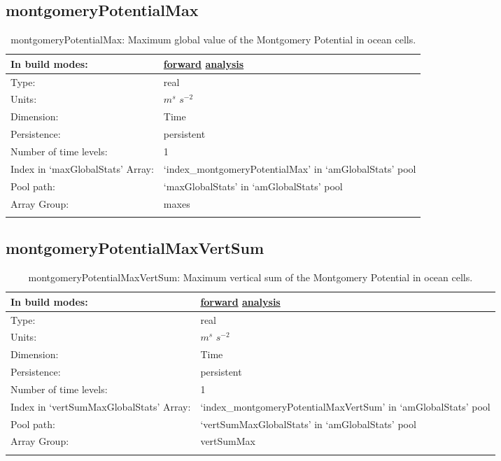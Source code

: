 \subsection[montgomeryPotentialMax]{montgomeryPotentialMax}
\label{subsec:var_sec_amGlobalStats_montgomeryPotentialMax}
\begin{center}
\begin{longtable}{| p{2.0in} | p{4.0in} |}
        \hline 
        In build modes: & \hyperref[subsec:forward_var_tab_amGlobalStats]{forward} \hyperref[subsec:analysis_var_tab_amGlobalStats]{analysis} \\
        \hline 
        Type: & real \\
        \hline 
        Units: & $m^s$ $s^{-2}$ \\
        \hline 
        Dimension: & Time \\
        \hline 
        Persistence: & persistent \\
        \hline 
        Number of time levels: & 1 \\
        \hline 
		 Index in `maxGlobalStats' Array: & `index\_montgomeryPotentialMax' in `amGlobalStats' pool \\
		 \hline 
            Pool path: & `maxGlobalStats' in `amGlobalStats' pool \\
		 \hline 
		 Array Group: & maxes \\
		 \hline 
    \caption{montgomeryPotentialMax: Maximum global value of the Montgomery Potential in ocean cells.}
\end{longtable}
\end{center}
\subsection[montgomeryPotentialMaxVertSum]{montgomeryPotentialMaxVertSum}
\label{subsec:var_sec_amGlobalStats_montgomeryPotentialMaxVertSum}
\begin{center}
\begin{longtable}{| p{2.0in} | p{4.0in} |}
        \hline 
        In build modes: & \hyperref[subsec:forward_var_tab_amGlobalStats]{forward} \hyperref[subsec:analysis_var_tab_amGlobalStats]{analysis} \\
        \hline 
        Type: & real \\
        \hline 
        Units: & $m^s$ $s^{-2}$ \\
        \hline 
        Dimension: & Time \\
        \hline 
        Persistence: & persistent \\
        \hline 
        Number of time levels: & 1 \\
        \hline 
		 Index in `vertSumMaxGlobalStats' Array: & `index\_montgomeryPotentialMaxVertSum' in `amGlobalStats' pool \\
		 \hline 
            Pool path: & `vertSumMaxGlobalStats' in `amGlobalStats' pool \\
		 \hline 
		 Array Group: & vertSumMax \\
		 \hline 
    \caption{montgomeryPotentialMaxVertSum: Maximum vertical sum of the Montgomery Potential in ocean cells.}
\end{longtable}
\end{center}
